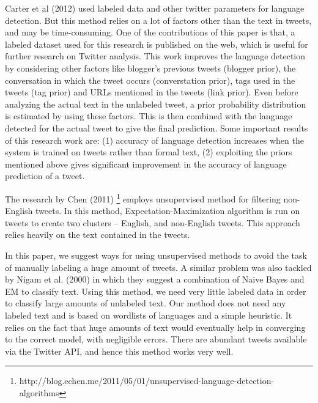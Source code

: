 \documentclass[11pt]{article}
\begin{document}
Carter et al (2012) used labeled data and other twitter parameters for language detection. But this method relies on a lot of factors other than the text in tweets, and may be time-consuming. One of the contributions of this paper is that, a labeled dataset used for this research is published on the web, which is useful for further research on Twitter analysis. This work improves the language detection by considering other factors like blogger's previous tweets (blogger prior), the conversation in which the tweet occurs (converstation prior), tags used in the tweets (tag prior) and URLs mentioned in the tweets (link prior). Even before analyzing the actual text in the unlabeled tweet, a prior probability distribution is estimated by using these factors. This is then combined with the language detected for the actual tweet to give the final prediction. Some important results of this research work are: (1) accuracy of language detection increases when the system is trained on tweets rather than formal text, (2) exploiting the priors mentioned above gives significant improvement in the accuracy of language prediction of a tweet.

The research by Chen (2011) \footnote[2]{http://blog.echen.me/2011/05/01/unsupervised-language-detection-algorithms} employs unsupervised method for filtering non-English tweets. In this method, Expectation-Maximization algorithm is run on tweets to create two clusters -- English, and non-English tweets. This approach relies heavily on the text contained in the tweets.

In this paper, we suggest ways for using unsupervised methods to avoid the task of manually labeling a huge amount of tweets. A similar problem was also tackled by Nigam et al. (2000) in which they suggest a combination of Naive Bayes and EM to classify text. Using this method, we need very little labeled data in order to classify large amounts of unlabeled text. Our method does not need any labeled text and is based on wordlists of languages and a simple heuristic. It relies on the fact that huge amounts of text would eventually help in converging to the correct model, with negligible errors. There are abundant tweets available via the Twitter API, and hence this method works very well.
\end{document}
